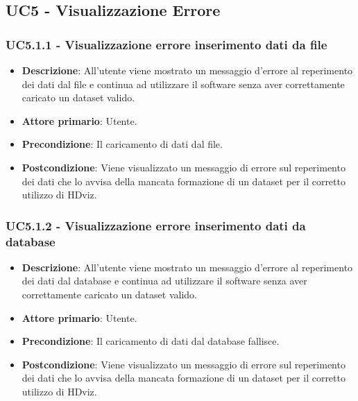 \newpage
\subsection{UC5 - Visualizzazione Errore}
\label{subsec:uc5}


\subsubsection{UC5.1.1 - Visualizzazione errore inserimento dati da file}
\label{subsec:uc5.1.1}
\begin{itemize}
    \item \textbf{Descrizione}: All'utente viene mostrato un messaggio d'errore al reperimento
                                dei dati dal file e continua ad utilizzare 
                                il software senza aver correttamente caricato un dataset valido.

    \item \textbf{Attore primario}: Utente.
    
    \item \textbf{Precondizione}:   Il caricamento di dati dal file.

    \item \textbf{Postcondizione}:  Viene visualizzato un messaggio di errore sul reperimento dei 
                                    dati che lo avvisa della mancata formazione di un dataset per il
                                    corretto utilizzo di HDviz.

\end{itemize}


\subsubsection{UC5.1.2 - Visualizzazione errore inserimento dati da database}
\label{subsec:uc5.1.2}
\begin{itemize}
    \item \textbf{Descrizione}: All'utente viene mostrato un messaggio d'errore al reperimento
                                dei dati dal database e continua ad utilizzare 
                                il software senza aver correttamente caricato un dataset valido.

    \item \textbf{Attore primario}: Utente.
    
    \item \textbf{Precondizione}:   Il caricamento di dati dal database fallisce.

    \item \textbf{Postcondizione}:  Viene visualizzato un messaggio di errore sul reperimento dei 
                                    dati che lo avvisa della mancata formazione di un dataset per il
                                    corretto utilizzo di HDviz.

\end{itemize}



